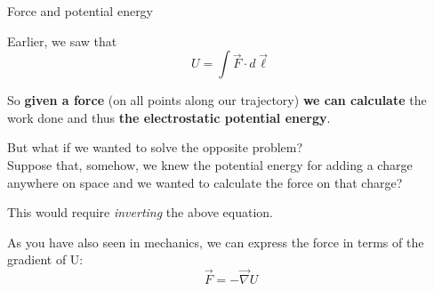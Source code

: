 %
%
%

\begin{frame}{Force and potential energy}

Earlier, we saw that
\begin{equation*}
  U = \int \vec{F} \cdot d\vec{\ell}
\end{equation*}

So {\bf given a force} (on all points along our trajectory)
{\bf we can calculate} the work done and thus {\bf the electrostatic potential energy}.\\

\vspace{0.3cm}

But what if we wanted to solve the opposite problem?\\
Suppose that, somehow, we knew the potential energy for adding a charge anywhere on space
and we wanted to calculate the force on that charge?\\

\vspace{0.2cm}

This would require {\em inverting} the above equation.\\

\vspace{0.2cm}

As you have also seen in mechanics,
we can express the force in terms of the gradient of U:
\begin{equation*}
  \vec{F} = -\vec{\nabla}U
\end{equation*}

\end{frame}

%
%

